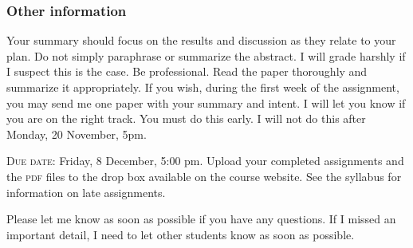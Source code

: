 \documentclass[12pt]{article}
\begin{document}
\subsubsection*{Other information}

Your summary should focus on the results and discussion as they relate to your plan. Do not simply paraphrase or summarize the abstract. I will grade harshly if I suspect this is the case. Be professional. Read the paper thoroughly and summarize it appropriately. If you wish, during the first week of the assignment, you may send me one paper with your summary and intent. I will let you know if you are on the right track. You must do this early. I will not do this after Monday, 20 November, 5pm.

\textsc{Due date:} Friday, 8 December, 5:00 pm. Upload your completed assignments and the \textsc{pdf} files to the drop box available on the course website. See the syllabus for information on late assignments.

\vspace*{\baselineskip}

Please let me know as soon as possible if you have any questions. If I missed an important detail, I need to let other students know as soon as possible.
\end{document}
